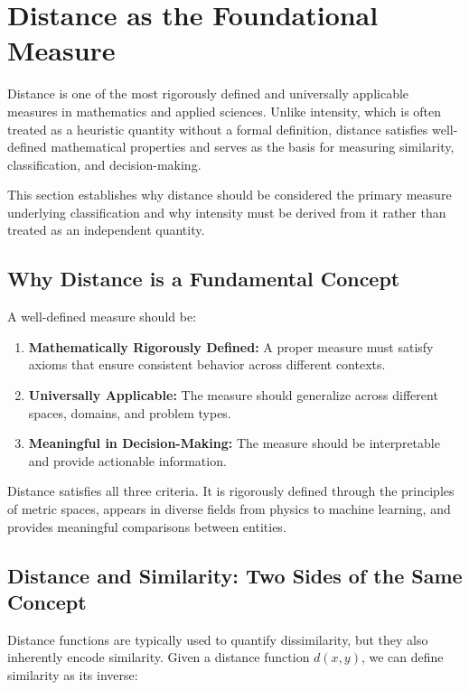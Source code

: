 \section{Distance as the Foundational Measure}

Distance is one of the most rigorously defined and universally applicable measures in mathematics and applied sciences. Unlike intensity, which is often treated as a heuristic quantity without a formal definition, distance satisfies well-defined mathematical properties and serves as the basis for measuring similarity, classification, and decision-making. 

This section establishes why distance should be considered the primary measure underlying classification and why intensity must be derived from it rather than treated as an independent quantity.

\subsection{Why Distance is a Fundamental Concept}

A well-defined measure should be:

\begin{enumerate}
    \item \textbf{Mathematically Rigorously Defined:} A proper measure must satisfy axioms that ensure consistent behavior across different contexts.
    \item \textbf{Universally Applicable:} The measure should generalize across different spaces, domains, and problem types.
    \item \textbf{Meaningful in Decision-Making:} The measure should be interpretable and provide actionable information.
\end{enumerate}

Distance satisfies all three criteria. It is rigorously defined through the principles of metric spaces, appears in diverse fields from physics to machine learning, and provides meaningful comparisons between entities.

\subsection{Distance and Similarity: Two Sides of the Same Concept}

Distance functions are typically used to quantify dissimilarity, but they also inherently encode similarity. Given a distance function \( d(x, y) \), we can define similarity as its inverse:

